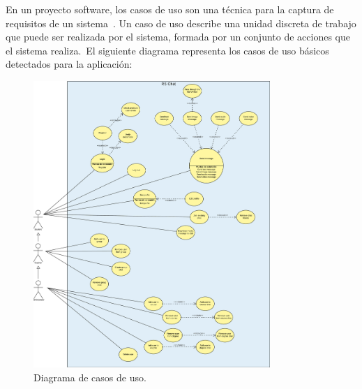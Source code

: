 
En un proyecto software, los casos de uso son una técnica para la captura de requisitos de un sistema~\cite{use_cases}.
Un caso de uso describe una unidad discreta de trabajo que puede ser realizada por el sistema, formada por un conjunto
de acciones que el sistema realiza.\ El siguiente diagrama representa los casos de uso básicos detectados para
la aplicación:

\begin{figure}[H]
	\centering
	\includegraphics[width=0.8\textwidth]{res/images/RSChat-Diagrams-Usecases}
	\caption{Diagrama de casos de uso.}
	\label{fig:casosDeUso}
\end{figure}
